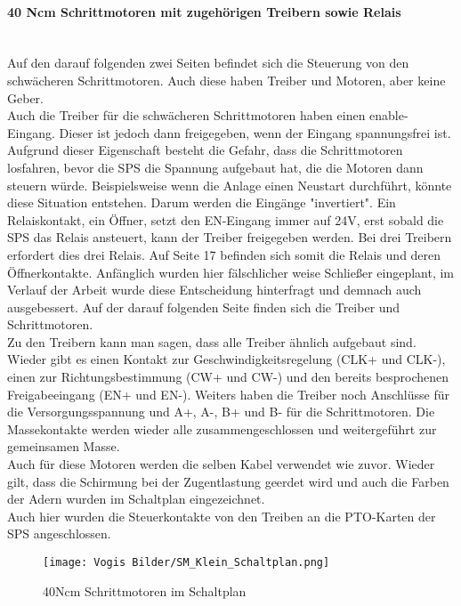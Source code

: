     \paragraph{40 Ncm Schrittmotoren mit zugehörigen Treibern sowie Relais}\mbox{}\\
    Auf den darauf folgenden zwei Seiten befindet sich die Steuerung von den schwächeren Schrittmotoren. Auch diese haben Treiber und Motoren, aber keine Geber.\\
    Auch die Treiber für die schwächeren Schrittmotoren haben einen enable-Eingang. Dieser ist jedoch dann freigegeben, wenn der Eingang spannungsfrei ist. Aufgrund dieser Eigenschaft besteht die Gefahr, dass die Schrittmotoren losfahren, bevor die SPS die Spannung aufgebaut hat, die die Motoren dann steuern würde. Beispielsweise wenn die Anlage einen Neustart durchführt, könnte diese Situation entstehen. Darum werden die Eingänge "invertiert". Ein Relaiskontakt, ein Öffner, setzt den EN-Eingang immer auf 24V, erst sobald die SPS das Relais ansteuert, kann der Treiber freigegeben werden. Bei drei Treibern erfordert dies drei Relais. Auf Seite 17 befinden sich somit die Relais und deren Öffnerkontakte. Anfänglich wurden hier fälschlicher weise Schließer eingeplant, im Verlauf der Arbeit wurde diese Entscheidung hinterfragt und demnach auch ausgebessert. Auf der darauf folgenden Seite finden sich die Treiber und Schrittmotoren.\\
    Zu den Treibern kann man sagen, dass alle Treiber ähnlich aufgebaut sind. Wieder gibt es einen Kontakt zur Geschwindigkeitsregelung (CLK+ und CLK-), einen zur Richtungsbestimmung (CW+ und CW-) und den bereits besprochenen Freigabeeingang (EN+ und EN-). Weiters haben die Treiber noch Anschlüsse für die Versorgungsspannung und A+, A-, B+ und B- für die Schrittmotoren. Die Massekontakte werden wieder alle zusammengeschlossen und weitergeführt zur gemeinsamen Masse.\\ 
    Auch für diese Motoren werden die selben Kabel verwendet wie zuvor. Wieder gilt, dass die Schirmung bei der Zugentlastung geerdet wird und auch die Farben der Adern wurden im Schaltplan eingezeichnet.\\
    Auch hier wurden die Steuerkontakte von den Treiben an die PTO-Karten der SPS angeschlossen.
    \begin{figure}[h]
        \centering
        \texttt{[image: Vogis Bilder/SM\_Klein\_Schaltplan.png]}
        \caption{40Ncm Schrittmotoren im Schaltplan}
        \label{fig:SMkleine}
    \end{figure}
